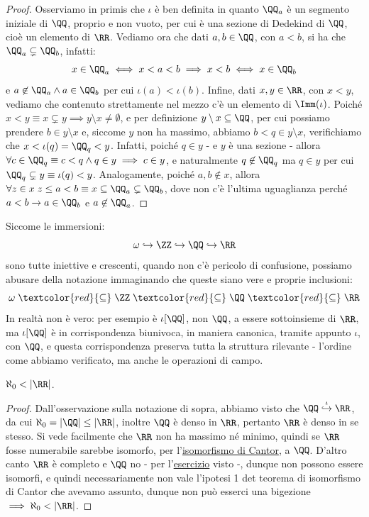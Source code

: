 \begin{proof}
	Osserviamo in primis che $\iota$ è ben definita in quanto $\QQ_a$ è un segmento iniziale di $\QQ$, proprio e non vuoto, per cui è una sezione di Dedekind di $\QQ$, cioè un elemento di $\RR$.
	Vediamo ora che dati $a,b \in \QQ$, con $a < b$, si ha che $\QQ_a \subsetneq \QQ_b$, infatti:
	\[ x \in \QQ_a \iff x < a < b \implies x < b \iff x \in \QQ_b
		\]
	e $a \not \in \QQ_a \land a \in \QQ_b$ per cui $\iota(a) < \iota(b)$. Infine, dati $x,y \in \RR$, con $x < y$, vediamo che contenuto strettamente nel mezzo c'è un elemento di $\Imm(\iota)$.
	Poiché $x < y \equiv x \subsetneq y \implies y \setminus x \ne \emptyset$, e per definizione $y \setminus x \subseteq \QQ$, per cui possiamo prendere $b \in y \setminus x$ e, siccome $y$ non ha massimo, abbiamo $b < q \in y \setminus x$, verifichiamo che $x < \iota(q) = \QQ_q < y$.
	Infatti, poiché $q \in y$ - e $y$ è una sezione - allora $\forall c \in \QQ_q \equiv c < q \land q \in y \implies c \in y$, e naturalmente $q \not \in \QQ_q$ ma $q \in y$ per cui $\QQ_q \subsetneq y \equiv \iota(q) < y$.
	Analogamente, poiché $a,b \not \in x$, allora $\forall z \in x \; z \leq a < b \equiv x \subseteq \QQ_a \subsetneq \QQ_b$, dove non c'è l'ultima uguaglianza perché $a < b \to a \in \QQ_b$ e $a \not \in \QQ_a$.
\end{proof}

\begin{notation}
	Siccome le immersioni:
	\[ \omega \hookrightarrow \ZZ \hookrightarrow \QQ \hookrightarrow \RR
		\]
	sono tutte iniettive e crescenti, quando non c'è pericolo di confusione, possiamo abusare della notazione immaginando che 
	queste siano vere e proprie inclusioni:
	\[ \omega \;\textcolor{red}{\subseteq}\; \ZZ \;\textcolor{red}{\subseteq} \;\QQ \;\textcolor{red}{\subseteq}\; \RR
		\]
	In realtà non è vero: per esempio è $\iota[\QQ]$, non $\QQ$, a essere sottoinsieme di $\RR$, ma $\iota[\QQ]$ è in corrispondenza biunivoca, in maniera 
	canonica, tramite appunto $\iota$, con $\QQ$, e questa corrispondenza preserva tutta la struttura rilevante - l'ordine come abbiamo verificato, ma anche le operazioni di campo.
\end{notation}

\begin{corollary}
	$\aleph_0 < |\RR|$.
\end{corollary}

\begin{proof}
	Dall'osservazione sulla notazione di sopra, abbiamo visto che $\QQ \overset{\iota}{\hookrightarrow} \RR$, da cui $\aleph_0 = |\QQ| \leq |\RR|$, inoltre $\QQ$ è denso in $\RR$, pertanto 
	$\RR$ è denso in se stesso. Si vede facilmente che $\RR$ non ha massimo né minimo, quindi se $\RR$ fosse numerabile sarebbe isomorfo, per l'\hyperref[isoCantor]{isomorfismo di Cantor},
	a $\QQ$. D'altro canto $\RR$ è completo e $\QQ$ no - per l'\hyperref[q_noncompleto]{esercizio} visto -, dunque non possono essere isomorfi, e quindi necessariamente non vale l'ipotesi 1 det teorema di isomorfismo di Cantor
	che avevamo assunto, dunque non può esserci una bigezione $\implies \aleph_0 < |\RR|$.
\end{proof}

